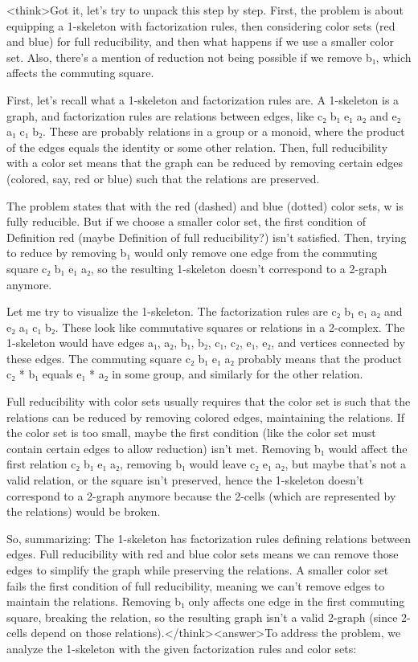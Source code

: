 <think>Got it, let's try to unpack this step by step. First, the problem is about equipping a 1-skeleton with factorization rules, then considering color sets (red and blue) for full reducibility, and then what happens if we use a smaller color set. Also, there's a mention of reduction not being possible if we remove b₁, which affects the commuting square.

First, let's recall what a 1-skeleton and factorization rules are. A 1-skeleton is a graph, and factorization rules are relations between edges, like c₂ b₁ e₁ a₂ and e₂ a₁ c₁ b₂. These are probably relations in a group or a monoid, where the product of the edges equals the identity or some other relation. Then, full reducibility with a color set means that the graph can be reduced by removing certain edges (colored, say, red or blue) such that the relations are preserved.

The problem states that with the red (dashed) and blue (dotted) color sets, w is fully reducible. But if we choose a smaller color set, the first condition of Definition red (maybe Definition of full reducibility?) isn't satisfied. Then, trying to reduce by removing b₁ would only remove one edge from the commuting square c₂ b₁ e₁ a₂, so the resulting 1-skeleton doesn't correspond to a 2-graph anymore.

Let me try to visualize the 1-skeleton. The factorization rules are c₂ b₁ e₁ a₂ and e₂ a₁ c₁ b₂. These look like commutative squares or relations in a 2-complex. The 1-skeleton would have edges a₁, a₂, b₁, b₂, c₁, c₂, e₁, e₂, and vertices connected by these edges. The commuting square c₂ b₁ e₁ a₂ probably means that the product c₂ * b₁ equals e₁ * a₂ in some group, and similarly for the other relation.

Full reducibility with color sets usually requires that the color set is such that the relations can be reduced by removing colored edges, maintaining the relations. If the color set is too small, maybe the first condition (like the color set must contain certain edges to allow reduction) isn't met. Removing b₁ would affect the first relation c₂ b₁ e₁ a₂, removing b₁ would leave c₂ e₁ a₂, but maybe that's not a valid relation, or the square isn't preserved, hence the 1-skeleton doesn't correspond to a 2-graph anymore because the 2-cells (which are represented by the relations) would be broken.

So, summarizing: The 1-skeleton has factorization rules defining relations between edges. Full reducibility with red and blue color sets means we can remove those edges to simplify the graph while preserving the relations. A smaller color set fails the first condition of full reducibility, meaning we can't remove edges to maintain the relations. Removing b₁ only affects one edge in the first commuting square, breaking the relation, so the resulting graph isn't a valid 2-graph (since 2-cells depend on those relations).</think><answer>To address the problem, we analyze the 1-skeleton with the given factorization rules and color sets:  

